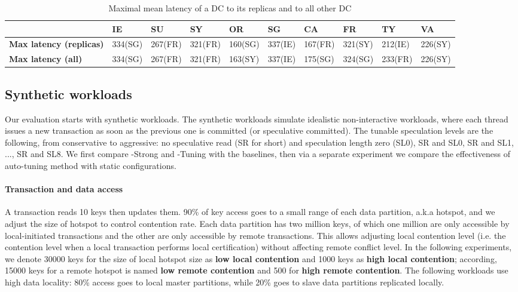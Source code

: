 \begin{table}
\small
\begin{center}
  \begin{tabular}{l |  l | l | l| l | l | l| l| l |l } 
     & IE & SU& SY& OR & SG & CA &  FR & TY & VA  \\ \hline
  \textbf{Max latency (replicas)} & 334(SG) & 267(FR) & 321(FR) & 160(SG)  & 337(IE) & 167(FR) & 321(SY)& 212(IE)  &  226(SY)  \\   \hline
  \textbf{Max latency (all)} &  334(SG) &  267(FR) & 321(FR)  & 163(SY) & 337(IE) & 175(SG) & 324(SG)  & 233(FR)  & 226(SY) \\ \hline
  \end{tabular}
\end{center}
\caption{Maximal mean latency of a DC to its replicas and to all other DC}
\label{tab:latency}
\end{table}


\subsection{Synthetic workloads}
Our evaluation starts with synthetic workloads. The synthetic workloads simulate idealistic non-interactive workloads, where each thread issues a new transaction as soon as the previous one is committed (or speculative committed). The tunable speculation levels are the following, from conservative to aggressive: no speculative read (SR for short) and speculation length zero (SL0), SR and SL0, SR and SL1, ..., SR and SL8. We first compare {\specula}-Strong and {\specula}-Tuning with the baselines, then via a separate experiment we compare the effectiveness of auto-tuning method with static configurations.

\paragraph{Transaction and data access} A transaction reads 10 keys then updates them. 90\% of key access goes to a small range of each data partition, a.k.a hotspot, and we adjust the size of hotspot to control contention rate. Each data partition has two million keys, of which one million are only accessible by local-initiated transactions and the other are only accessible by remote transactions. This allows adjusting local contention level (i.e. the contention level when a local transaction performs local certification) without affecting remote conflict level. In the following experiments, we denote 30000 keys for the size of local hotspot size as \textbf{low local contention} and 1000 keys as \textbf{high local contention}; according, 15000 keys for a remote hotspot is named \textbf{low remote contention} and 500 for \textbf{high remote contention}. The following workloads use high data locality: 80\% access goes to local master partitions, while 20\% goes to slave data partitions replicated locally.

